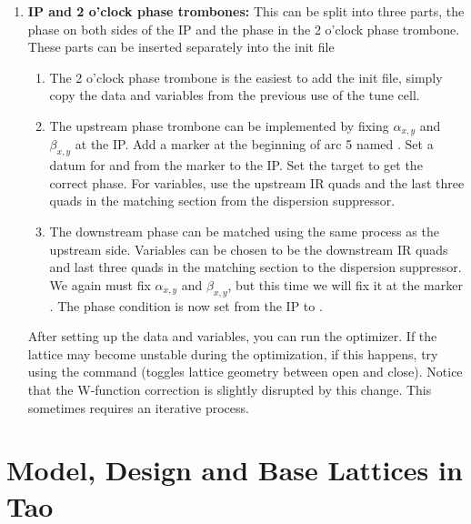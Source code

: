 \documentclass{hitec}     %
\begin{document}
{{{{\begin{enumerate}[leftmargin=*]
    \item {\bf IP and 2 o'clock phase trombones:} This can be split into three parts, the phase on both sides of the IP and the phase in the 2 o'clock phase trombone. These parts can be inserted separately into the init file
    \begin{enumerate}
        \item The 2 o'clock phase trombone is the easiest to add the init file, simply copy the data and variables from the previous use of the tune cell.
        \item The upstream phase trombone can be implemented by fixing  $\alpha_{x,y}$ and $\beta_{x,y}$ at the IP. Add a marker at the beginning of arc 5 named . Set a datum for  and  from the marker to the IP. Set the target to get the correct phase. For variables, use the upstream IR quads and the last three quads in the matching section from the dispersion suppressor.
        \item The downstream phase can be matched using the same process as the upstream side. Variables can be chosen to be the downstream IR quads and last three quads in the matching section to the dispersion suppressor. We again must fix $\alpha_{x,y}$ and $\beta_{x,y}$, but this time we will fix it at the marker . The phase condition is now set from the IP to .
    \end{enumerate}
    After setting up the data and variables, you can run the optimizer. If the lattice may become unstable during the optimization, if this happens, try using the  command (toggles lattice geometry between open and close). Notice that the W-function correction is slightly disrupted by this change. This sometimes requires an iterative process.
\end{enumerate}
\newpage

\section{Model, Design and Base Lattices in Tao}
\label{s:three.lat}

}}}}
\end{document}

